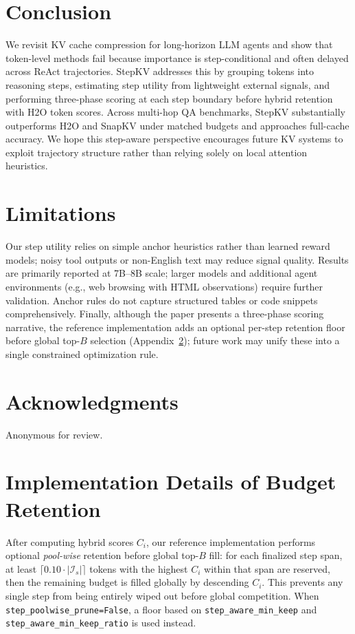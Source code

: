 \documentclass[11pt]{article}
\begin{document}
\section{Conclusion}

We revisit KV cache compression for long-horizon LLM agents and show that token-level methods fail because importance is step-conditional and often delayed across ReAct trajectories.
StepKV addresses this by grouping tokens into reasoning steps, estimating step utility from lightweight external signals, and performing three-phase scoring at each step boundary before hybrid retention with H2O token scores.
Across multi-hop QA benchmarks, StepKV substantially outperforms H2O and SnapKV under matched budgets and approaches full-cache accuracy.
We hope this step-aware perspective encourages future KV systems to exploit trajectory structure rather than relying solely on local attention heuristics.

\section*{Limitations}

Our step utility relies on simple anchor heuristics rather than learned reward models; noisy tool outputs or non-English text may reduce signal quality.
Results are primarily reported at 7B--8B scale; larger models and additional agent environments (e.g., web browsing with HTML observations) require further validation.
Anchor rules do not capture structured tables or code snippets comprehensively.
Finally, although the paper presents a three-phase scoring narrative, the reference implementation adds an optional per-step retention floor before global top-$B$ selection (Appendix~\ref{app:implementation}); future work may unify these into a single constrained optimization rule.

\section*{Acknowledgments}

Anonymous for review.

\appendix

\section{Implementation Details of Budget Retention}
\label{app:implementation}

After computing hybrid scores $C_i$, our reference implementation performs optional \emph{pool-wise} retention before global top-$B$ fill:
for each finalized step span, at least $\lceil 0.10 \cdot |\mathcal{I}_s|\rceil$ tokens with the highest $C_i$ within that span are reserved, then the remaining budget is filled globally by descending $C_i$.
This prevents any single step from being entirely wiped out before global competition.
When \texttt{step\_poolwise\_prune=False}, a floor based on \texttt{step\_aware\_min\_keep} and \texttt{step\_aware\_min\_keep\_ratio} is used instead.
\end{document}
